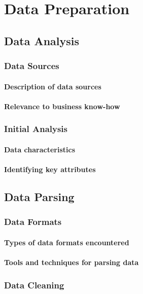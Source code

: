 \chapter{Data Preparation}

\section{Data Analysis}

\subsection{Data Sources}
\subsubsection{Description of data sources}
\subsubsection{Relevance to business know-how}

\subsection{Initial Analysis}
\subsubsection{Data characteristics}
\subsubsection{Identifying key attributes}

\section{Data Parsing}

\subsection{Data Formats}
\subsubsection{Types of data formats encountered}
\subsubsection{Tools and techniques for parsing data}

\subsection{Data Cleaning}
